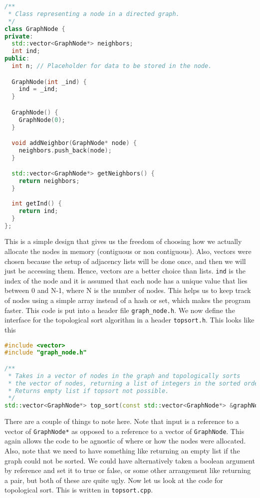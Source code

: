 \begin{lstlisting}[language=c++]
/**
 * Class representing a node in a directed graph.
 */
class GraphNode {
private:
  std::vector<GraphNode*> neighbors;
  int ind;
public:
  int n; // Placeholder for data to be stored in the node.

  GraphNode(int _ind) {
    ind = _ind;
  }

  GraphNode() {
    GraphNode(0);
  }

  void addNeighbor(GraphNode* node) {
    neighbors.push_back(node);
  }

  std::vector<GraphNode*> getNeighbors() {
    return neighbors;
  }
  
  int getInd() {
    return ind;
  }
};
\end{lstlisting}
This is a simple design that gives us the freedom of choosing how we
actually allocate the nodes in memory (contiguous or non contiguous).
Also, vectors were chosen because the setup of adjacency lists will be 
done once, and then we will just be accessing them. Hence, vectors are 
a better choice than lists. \verb+ind+ is the index of the node and it 
is assumed that each node has a unique value that lies between 0 and 
N-1, where N is the number of nodes. This helps us to keep track of 
nodes using a simple array instead of a hash or set, which makes the
program faster. This code is put into a header file \verb+graph_node.h+.
We now define the interface for the topological sort algorithm in a 
header \verb+topsort.h+. This looks like this
\begin{lstlisting}[language=c++]
#include <vector>
#include "graph_node.h"

/**
 * Takes in a vector of nodes in the graph and topologically sorts
 * the vector of nodes, returning a list of integers in the sorted order.
 * Returns empty list if topsort not possible.
 */
std::vector<GraphNode*> top_sort(const std::vector<GraphNode*> &graphNodes);
\end{lstlisting}
There are a couple of things to note here. Note that input is a reference 
to a vector of \verb+GraphNode*+ as opposed to a reference to a vector of 
\verb+GraphNode+. This again allows the code to be agnostic of where or how
the nodes were allocated. Also, note that we need to have something like 
returning an empty list if the graph could not be sorted. We could have
alternatively taken a boolean argument by reference and set it to true or
false, or some other arrangement like returning a pair, but both of these 
are quite ugly. Now let us look at the code for topological sort. This is
written in \verb+topsort.cpp+. 

